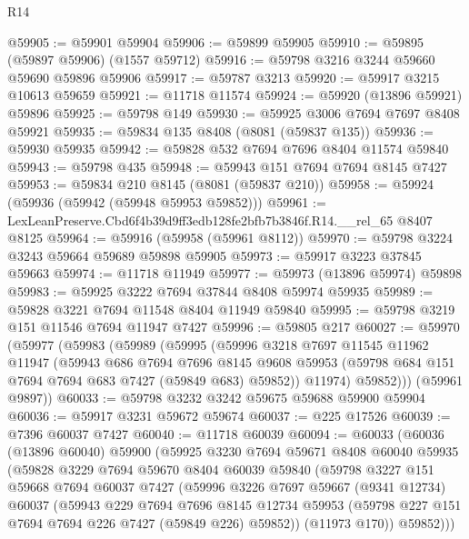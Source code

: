 \begin{lexlean}{R14}
\begin{coremodule}
@59905 := @59901 @59904
@59906 := @59899 @59905
@59910 := @59895 (@59897 @59906) (@1557 @59712)
@59916 := @59798 @3216 @3244 @59660 @59690 @59896 @59906
@59917 := @59787 @3213
@59920 := @59917 @3215 @10613 @59659
@59921 := @11718 @11574
@59924 := @59920 (@13896 @59921) @59896
@59925 := @59798 @149
@59930 := @59925 @3006 @7694 @7697 @8408 @59921
@59935 := @59834 @135 @8408 (@8081 (@59837 @135))
@59936 := @59930 @59935
@59942 := @59828 @532 @7694 @7696 @8404 @11574 @59840
@59943 := @59798 @435
@59948 := @59943 @151 @7694 @7694 @8145 @7427
@59953 := @59834 @210 @8145 (@8081 (@59837 @210))
@59958 := @59924 (@59936 (@59942 (@59948 @59953 @59852)))
@59961 := LexLeanPreserve.Cbd6f4b39d9ff3edb128fe2bfb7b3846f.R14.__rel_65 @8407 @8125
@59964 := @59916 (@59958 (@59961 @8112))
@59970 := @59798 @3224 @3243 @59664 @59689 @59898 @59905
@59973 := @59917 @3223 @37845 @59663
@59974 := @11718 @11949
@59977 := @59973 (@13896 @59974) @59898
@59983 := @59925 @3222 @7694 @37844 @8408 @59974 @59935
@59989 := @59828 @3221 @7694 @11548 @8404 @11949 @59840
@59995 := @59798 @3219 @151 @11546 @7694 @11947 @7427
@59996 := @59805 @217
@60027 := @59970
    (@59977
      (@59983
        (@59989
          (@59995
            (@59996
              @3218
              @7697
              @11545
              @11962
              @11947
              (@59943
                @686
                @7694
                @7696
                @8145
                @9608
                @59953
                (@59798 @684 @151 @7694 @7694 @683 @7427 (@59849 @683) @59852))
              @11974)
            @59852)))
      (@59961 @9897))
@60033 := @59798 @3232 @3242 @59675 @59688 @59900 @59904
@60036 := @59917 @3231 @59672 @59674
@60037 := @225 @17526
@60039 := @7396 @60037 @7427
@60040 := @11718 @60039
@60094 := @60033
    (@60036
      (@13896 @60040)
      @59900
      (@59925
        @3230
        @7694
        @59671
        @8408
        @60040
        @59935
        (@59828
          @3229
          @7694
          @59670
          @8404
          @60039
          @59840
          (@59798
            @3227
            @151
            @59668
            @7694
            @60037
            @7427
            (@59996
              @3226
              @7697
              @59667
              (@9341 @12734)
              @60037
              (@59943
                @229
                @7694
                @7696
                @8145
                @12734
                @59953
                (@59798 @227 @151 @7694 @7694 @226 @7427 (@59849 @226) @59852))
              (@11973 @170))
            @59852)))

\end{coremodule}
\end{lexlean}
